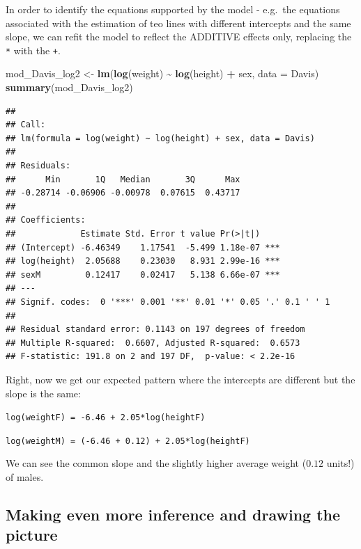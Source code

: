 \documentclass[
]{book}
\newenvironment{Shaded}{\begin{snugshade}}{\end{snugshade}}
\newcommand{\AttributeTok}[1]{\textcolor[rgb]{0.13,0.29,0.53}{#1}}
\newcommand{\FunctionTok}[1]{\textcolor[rgb]{0.13,0.29,0.53}{\textbf{#1}}}
\newcommand{\NormalTok}[1]{#1}
\newcommand{\OtherTok}[1]{\textcolor[rgb]{0.56,0.35,0.01}{#1}}
\newcommand{\SpecialCharTok}[1]{\textcolor[rgb]{0.81,0.36,0.00}{\textbf{#1}}}
\begin{document}
In order to identify the equations supported by the model - e.g.~the equations associated with the estimation of teo lines with different intercepts and the same slope, we can refit the model to reflect the ADDITIVE effects only, replacing the \texttt{*} with the \texttt{+}.

\begin{Shaded}
\begin{Highlighting}[]
\NormalTok{mod\_Davis\_log2 }\OtherTok{\textless{}{-}} \FunctionTok{lm}\NormalTok{(}\FunctionTok{log}\NormalTok{(weight) }\SpecialCharTok{\textasciitilde{}} \FunctionTok{log}\NormalTok{(height) }\SpecialCharTok{+}\NormalTok{ sex, }\AttributeTok{data =}\NormalTok{ Davis)}
\FunctionTok{summary}\NormalTok{(mod\_Davis\_log2)}
\end{Highlighting}
\end{Shaded}

\begin{verbatim}
## 
## Call:
## lm(formula = log(weight) ~ log(height) + sex, data = Davis)
## 
## Residuals:
##      Min       1Q   Median       3Q      Max 
## -0.28714 -0.06906 -0.00978  0.07615  0.43717 
## 
## Coefficients:
##             Estimate Std. Error t value Pr(>|t|)    
## (Intercept) -6.46349    1.17541  -5.499 1.18e-07 ***
## log(height)  2.05688    0.23030   8.931 2.99e-16 ***
## sexM         0.12417    0.02417   5.138 6.66e-07 ***
## ---
## Signif. codes:  0 '***' 0.001 '**' 0.01 '*' 0.05 '.' 0.1 ' ' 1
## 
## Residual standard error: 0.1143 on 197 degrees of freedom
## Multiple R-squared:  0.6607, Adjusted R-squared:  0.6573 
## F-statistic: 191.8 on 2 and 197 DF,  p-value: < 2.2e-16
\end{verbatim}

Right, now we get our expected pattern where the intercepts are different but the slope is the same:

\texttt{log(weightF)\ =\ -6.46\ +\ 2.05*log(heightF)}

\texttt{log(weightM)\ =\ (-6.46\ +\ 0.12)\ +\ 2.05*log(heightF)}

We can see the common slope and the slightly higher average weight (\(0.12\) units!) of males.

\hypertarget{making-even-more-inference-and-drawing-the-picture}{%
\subsection{Making even more inference and drawing the picture}\label{making-even-more-inference-and-drawing-the-picture}}
\end{document}
